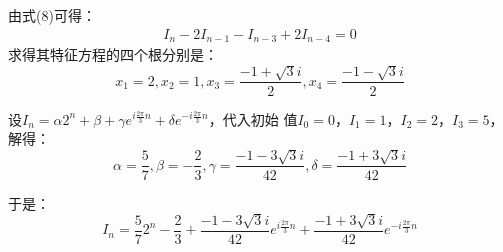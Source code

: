 \begin{solution}
    由式(8)可得：
    \begin{align*}
        I_n -2I_{n-1}-I_{n-3}+2I_{n-4} = 0
    \end{align*}
    求得其特征方程的四个根分别是：
    $$x_1=2,x_2=1,x_3=\frac{-1+\sqrt{3}i}{2},x_4=\frac{-1-\sqrt{3}i}{2}$$

    设$I_n=\alpha2^n+\beta+\gamma e^{i\frac{2\pi}{3}n} + \delta e^{-i\frac{2\pi}{3}n}$，代入初始
    值$I_0=0$，$I_1=1$，$I_2=2$，$I_3=5$，解得：
    $$\alpha=\frac{5}{7},\beta=-\frac{2}{3},\gamma=\frac{-1-3\sqrt{3}i}{42},\delta=\frac{-1+3\sqrt{3}i}{42}$$

    于是：
    $$I_n=\frac{5}{7}2^n-\frac{2}{3}+\frac{-1-3\sqrt{3}i}{42} e^{i\frac{2\pi}{3}n} + \frac{-1+3\sqrt{3}i}{42} e^{-i\frac{2\pi}{3}n}$$

\end{solution}